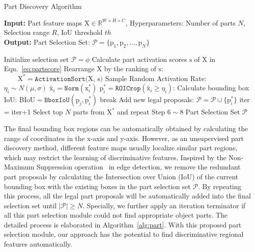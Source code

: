\documentclass[journal]{IEEEtran}
\newcommand{\mc}[1]{\mathcal{#1}}
\newcommand{\br}[1]{\bm{\mathrm{#1}}}
\newcommand{\bs}[1]{\boldsymbol{\texttt{#1}}}
\begin{document}
\begin{algorithm}[!t]
\caption{Part Discovery Algorithm}\label{alg:part}
\hspace*{0.02in} {\bf Input:}
Part feature maps $\br{X} \in \mathbb{R}^{W \times H \times C}$, Hyperparameters: Number of parts $N$, Selection range $R$, IoU threshold $th$\\
\hspace*{0.02in} {\bf Output:}
Part Selection Set:  $\mc{P} = \{\br{p}_1,\br{p}_2, \ldots, \br{p}_N\}$
\begin{algorithmic}[1]
\State Initialize selection set $\mc{P}=\phi$
\While{ $|\mc{P}|<N$ }
    \State Calculate part activation scores $\br{s}$ of $\br{X}$  in Eqn.~\eqref{eq:partscore}
    \State Rearrange $\br{X}$ by the ranking of $\br{s}$:
    \Statex $\qquad   \br{X}^{*}  = \bs{ActivationSort}(\br{X}$, $\br{s})$
    \For{ $ \br{x}^{*}_i \in \br{X}^{*} $}
    \State Sample Random Activation Rate: $\eta_i \sim  {N}(\mu,\sigma)$
    \State $\widetilde{\br{x}_i} =\bs{Norm}(\br{x}^{*}_i) $
    \State $\br{p}^{*}_i= \bs{ROICrop} (\widetilde{\br{x}_i} \ge \eta_i)$:
    \For{ $ \br{p}_j \in \mc{P}$}
    \State Calculate bounding box IoU:
    \Statex \qquad \qquad \qquad  BIoU$=\bs{BboxIoU}(\br{p}_j,\br{p}^{*}_i)$
    \State break
    \EndIf
    \State Add new legal proposals: $\mc{P} = \mc{P} \cup \{ \br{p}^{*}_i \} $
    \EndFor
    \EndFor
    \State iter = iter+1
    \If{iter $>$ maxiter and $|\mc{P}|<N$}
	\State Select top $N$ parts from $\br{X}^{*}$ and repeat Step $6\sim 8$
    \EndIf
\EndWhile
\State \Return Part Selection Set $\mc{P}$
\end{algorithmic}
\end{algorithm}



The final bounding box regions can be automatically obtained by calculating the range of coordinates in the x-axis and y-axis.
However, as an unsupervised part discovery method, different feature maps usually localize similar part regions, which may restrict the learning of discriminative features. Inspired by the Non-Maximum Suppression operation~\cite{rosenfeld1971edge} in edge detection, we remove the redundant part proposals by calculating the Intersection over Union (IoU) of the current bounding box with the existing boxes in the part selection set $\mc{P}$. By repeating this process, all the legal part proposals will be automatically added into the final selection set until $|\mc{P}| \ge N$. Specially, we further apply an iteration terminator if all this part selection module could not find appropriate object parts.
The detailed process is elaborated in Algorithm~\ref{alg:part}. With this proposed part selection module, our approach has the potential to find discriminative regional features automatically.
\end{document}

